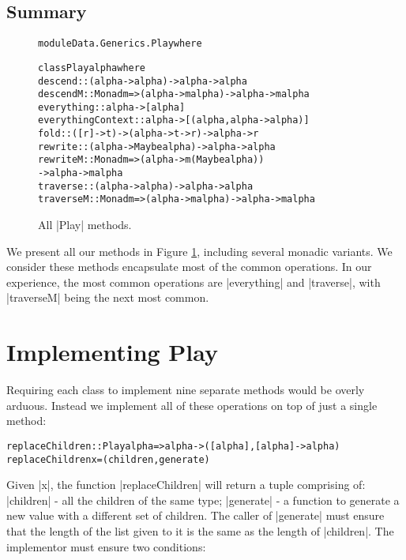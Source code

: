 \documentclass[preprint]{sigplanconf}
\newenvironment{code}{\begin{alltt}\small}{\end{alltt}}
\begin{document}
\subsection{Summary}

\begin{figure}
\begin{code}
module Data.Generics.Play where

class Play alpha where
    descend            :: (alpha -> alpha) -> alpha -> alpha
    descendM           :: Monad m => (alpha -> m alpha) -> alpha -> m alpha
    everything         :: alpha -> [alpha]
    everythingContext  :: alpha -> [(alpha, alpha -> alpha)]
    fold               :: ([r] -> t) -> (alpha -> t -> r) -> alpha -> r
    rewrite            :: (alpha -> Maybe alpha) -> alpha -> alpha
    rewriteM           :: Monad m  => (alpha -> m (Maybe alpha))
                                   -> alpha -> m alpha
    traverse           :: (alpha -> alpha) -> alpha -> alpha
    traverseM          :: Monad m => (alpha -> m alpha) -> alpha -> m alpha
\end{code}
\caption{All |Play| methods.}
\label{fig:play}
\end{figure}

We present all our methods in Figure \ref{fig:play}, including several monadic variants. We consider these methods encapsulate most of the common operations. In our experience, the most common operations are |everything| and |traverse|, with |traverseM| being the next most common.


\section{Implementing Play}

Requiring each class to implement nine separate methods would be overly arduous. Instead we implement all of these operations on top of just a single method:

\begin{code}
replaceChildren :: Play alpha => alpha -> ([alpha], [alpha] -> alpha)
replaceChildren x = (children,generate)
\end{code}

Given |x|, the function |replaceChildren| will return a tuple comprising of: |children| - all the children of the same type; |generate| - a function to generate a new value with a different set of children. The caller of |generate| must ensure that the length of the list given to it is the same as the length of |children|. The implementor must ensure two conditions:
\end{document}
